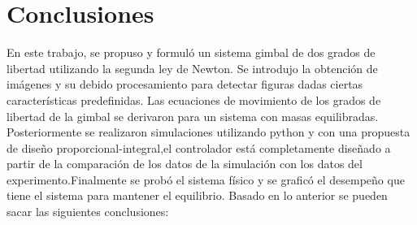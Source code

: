 \chapter{Conclusiones}
En este trabajo, se propuso y formuló un sistema gimbal de dos grados de libertad utilizando la segunda ley de Newton. Se introdujo
la obtención de imágenes y su debido procesamiento para detectar figuras dadas ciertas características predefinidas. Las ecuaciones de
movimiento de los grados de libertad de la gimbal se derivaron para un sistema con masas equilibradas. Posteriormente se realizaron simulaciones
utilizando python y con una propuesta de diseño proporcional-integral,el controlador está completamente diseñado a partir de la comparación de los 
datos de la simulación con los datos del experimento.Finalmente se probó el sistema físico y se graficó el desempeño
que tiene el sistema para mantener el equilibrio. Basado en lo anterior se pueden sacar las siguientes conclusiones:
